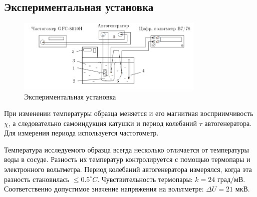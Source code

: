 \documentclass[a4paper, 14pt]{extarticle}%
\newcommand\ECaption[1]{%
     \captionsetup{font=footnotesize}%
     \caption{#1}}
\begin{document}
\subsection*{Экспериментальная установка}
\begin{figure}[h!]
\begin{center}
\includegraphics[width=0.8\textwidth]{ust}
\end{center}
\ECaption{Экспериментальная установка}
\end{figure}
При изменении температуры образца меняется и его магнитная восприимчивость $\chi$, а следовательно самоиндукция катушки и период колебаний $\tau$ автогенератора. Для измерения периода используется частотометр.

Температура исследуемого образца всегда несколько отличается от температуры воды в сосуде. Разность их температур контролируется с помощью термопары и электронного вольтметра. Период колебаний автогенератора измерялся, когда эта разность становилась $\leq 0.5^{\circ} C$. Чувствительность термопары: $k = 24 \text{ град/мВ}$. Соответственно допустимое значение напряжения на вольтметре: $\Delta U = 21\text{ мкВ}$.
\end{document}
